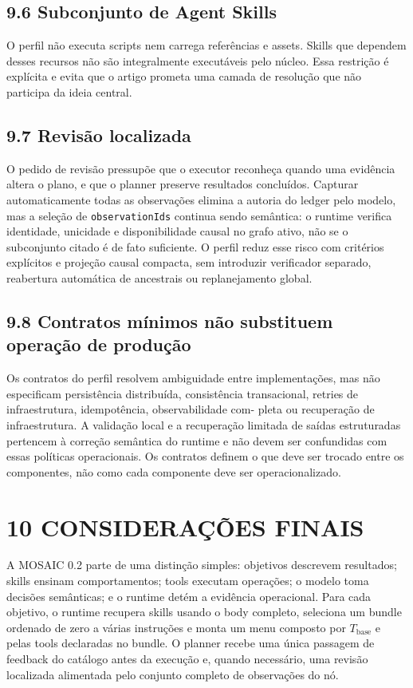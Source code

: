 \documentclass[12pt,a4paper]{article}
\begin{document}

\subsection*{9.6 Subconjunto de Agent Skills}

O perfil não executa scripts nem carrega referências e assets. Skills que dependem desses recursos não são integralmente executáveis pelo núcleo. Essa restrição é explícita e evita que o artigo prometa uma camada de resolução que não participa da ideia central.


\subsection*{9.7 Revisão localizada}

O pedido de revisão pressupõe que o executor reconheça quando uma evidência altera o plano, e que o planner preserve resultados concluídos. Capturar automaticamente todas as observações elimina a autoria do ledger pelo modelo, mas a seleção de \texttt{observationIds} continua sendo semântica: o runtime verifica identidade, unicidade e disponibilidade causal no grafo ativo, não se o subconjunto citado é de fato suficiente. O perfil reduz esse risco com critérios explícitos e projeção causal compacta, sem introduzir verificador separado, reabertura automática de ancestrais ou replanejamento global.


\subsection*{9.8 Contratos mínimos não substituem operação de produção}

Os contratos do perfil resolvem ambiguidade entre implementações, mas não especificam persistência distribuída, consistência transacional, retries de infraestrutura, idempotência, observabilidade com- pleta ou recuperação de infraestrutura. A validação local e a recuperação limitada de saídas estruturadas pertencem à correção semântica do runtime e não devem ser confundidas com essas políticas operacionais. Os contratos definem o que deve ser trocado entre os componentes, não como cada componente deve ser operacionalizado.


\section*{10 CONSIDERAÇÕES FINAIS}

A MOSAIC 0.2 parte de uma distinção simples: objetivos descrevem resultados; skills ensinam comportamentos; tools executam operações; o modelo toma decisões semânticas; e o runtime detém a evidência operacional. Para cada objetivo, o runtime recupera skills usando o body completo, seleciona um bundle ordenado de zero a várias instruções e monta um menu composto por \(T_{\mathrm{base}}\) e pelas tools declaradas no bundle. O planner recebe uma única passagem de feedback do catálogo antes da execução e, quando necessário, uma revisão localizada alimentada pelo conjunto completo de observações do nó.
\end{document}
